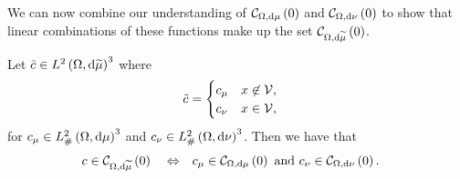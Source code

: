 We can now combine our understanding of $\mathcal{C}_{ \Omega, \mathrm{d}\mu}\left( 0 \right)$ and $\mathcal{C}_{ \Omega, \mathrm{d}\nu}\left( 0 \right)$ to show that linear combinations of these functions make up the set $\mathcal{C}_{ \Omega, \mathrm{d}\widetilde{\mu}}\left( 0 \right)$.
\begin{prop} \label{prop:ThickVertexCurlZeroCharacterisation}
	Let $\tilde{c}\in L^{2}\left( \Omega,\mathrm{d} \widetilde{\mu} \right)^3$ where
	\begin{align*}
		\tilde{c} &= \begin{cases} c_{\mu} & x\not\in\mathcal{V}, \\ c_{\nu} & x\in\mathcal{V}, \end{cases}
	\end{align*}
	for $c_{\mu}\in L^2_{\#}\left( \Omega,\mathrm{d} \mu \right)^3$ and $c_{\nu}\in L^2_{\#}\left( \Omega,\mathrm{d} \nu \right)^3$.
	Then we have that
	\begin{align*}
		c\in\mathcal{C}_{ \Omega, \mathrm{d}\widetilde{\mu}}\left( 0 \right) \quad\Leftrightarrow\quad 
		& c_{\mu}\in\mathcal{C}_{ \Omega, \mathrm{d}\mu}\left( 0 \right) \text{ and } c_{\nu}\in\mathcal{C}_{ \Omega, \mathrm{d}\nu}\left( 0 \right).
	\end{align*}
\end{prop}
